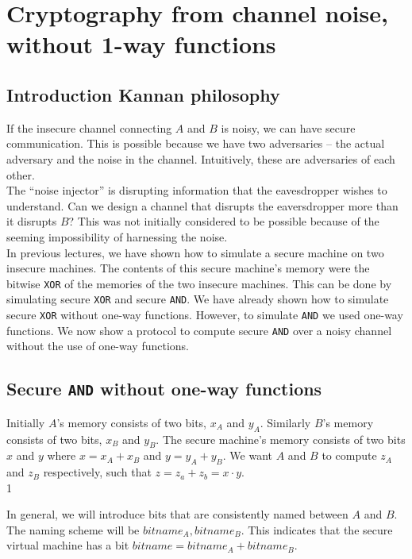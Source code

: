 \documentclass[11pt]{article}
\begin{document}
\section{Cryptography from channel noise, without 1-way functions}

\subsection{Introduction Kannan philosophy}
If the insecure channel connecting $A$ and $B$ is noisy, we can have secure communication.
This is possible because we have two adversaries -- the actual adversary and the noise
in the channel. Intuitively, these are adversaries of each other. \\

The ``noise injector'' is disrupting information that the eavesdropper wishes to understand. Can we design a channel that disrupts the eaversdropper more than it disrupts $B$? This was not initially considered to be  possible because of the seeming impossibility of harnessing the noise. \\

In previous lectures, we have shown how to simulate a secure machine on two insecure machines. The contents of this secure machine's memory were the bitwise \texttt{XOR} of the memories of the two insecure machines. This can be done by simulating secure \texttt{XOR} and secure \texttt{AND}. We have already shown how to simulate secure \texttt{XOR} without one-way functions. However, to simulate \texttt{AND} we used one-way functions. We now show a protocol to compute secure \texttt{AND} over a noisy channel without the use of one-way functions. 

\subsection{Secure \texttt{AND} without one-way functions}

Initially $A$'s memory consists of two bits, $x_A$ and $y_A$. Similarly $B$'s memory consists of two bits, $x_B$ and  $y_B$. The secure machine's memory consists of two bits $x$ and $y$ where $x = x_A + x_B$ and $y = y_A + y_B$. We want $A$ and $B$ to compute $z_A$ and $z_B$ respectively, such that $z = z_a + z_b = x \cdot y$. \\1

In general, we will introduce bits that are consistently named between $A$ and $B$. The naming scheme will be
$bitname_A, bitname_B$. This indicates that the secure virtual machine has a bit $bitname = bitname_A + bitname_B$.
\end{document}
